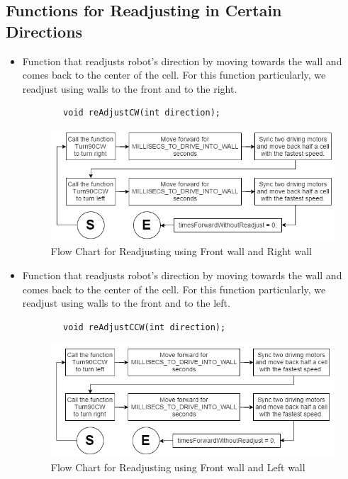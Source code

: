 \documentclass[11pt]{article}
\begin{document}

\subsection{Functions for Readjusting in Certain Directions}
\begin{itemize}
\item Function that readjusts robot's direction by moving towards the wall and comes back to the center of the cell. For this function particularly, we readjust using walls to the front and to the right.
	\begin{verbatim}
		void reAdjustCW(int direction);
	\end{verbatim}
\begin{figure}[htp]
\centering
\includegraphics[scale=0.52]{images/Software_Flowchart/reAdjustCW.png}
\caption{Flow Chart for Readjusting using Front wall and Right wall}
\label{}
\end{figure}
\item Function that readjusts robot's direction by moving towards the wall and comes back to the center of the cell. For this function particularly, we readjust using walls to the front and to the left.
	\begin{verbatim}
		void reAdjustCCW(int direction);
	\end{verbatim}
\begin{figure}[htp]
\centering
\includegraphics[scale=0.52]{images/Software_Flowchart/reAdjustCCW.png}
\caption{Flow Chart for Readjusting using Front wall and Left wall}

\end{figure}
\end{itemize}
\end{document}

